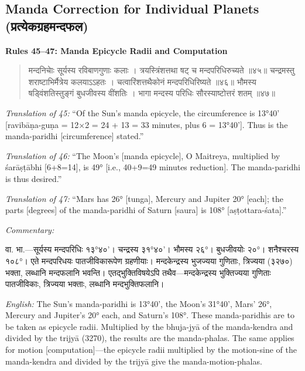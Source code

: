 \documentclass[11pt,a4paper]{book}
\newcommand{\dev}[1]{{\devanagarifont #1}}
\newenvironment{shloka}{%
  \begin{verse}
  \devanagarifont\color{versecolor}%
}{\end{verse}}
\newenvironment{vasaanaskt}{%
  \par\vspace{0.5em}\noindent\small\textit{Commentary:}%
}{\par\vspace{0.5em}}
\newcommand{\ruleheading}[1]{%
  \par\vspace{0.8em}\noindent\textbf{\color{sectioncolor}#1}\par\vspace{0.3em}%
}
\begin{document}
\subsection{Manda Correction for Individual Planets (\dev{प्रत्येकग्रहमन्दफल})}

\ruleheading{Rules 45--47: Manda Epicycle Radii and Computation}

\begin{shloka}
\begin{altverse}
\dev{मन्दनिचेाः सूर्यस्य रविबाणगुणाः कलाः ।}
\dev{त्रयस्त्रिंशत्तथा षट् च मन्दपरिधिरुच्यते ॥४५॥}
\dev{चन्द्रमस्तु शराष्टाभिर्मैत्रेय कलयाऽऽहतः ।}
\dev{चत्वारिंशत्तथैकोनं मन्दपरिधिरिष्यते ॥४६॥}
\dev{भौमस्य षड्विंशतिस्तुङ्गं बुधजीवस्य वींशतिः ।}
\dev{भागा मन्दस्य परिधिः सौरस्याष्टोत्तरं शतम् ॥४७॥}
\end{altverse}
\end{shloka}

\textit{Translation of 45:} ``Of the Sun's manda epicycle, the circumference is 13°40' [ravibāṇa-guṇa = 12×2 = 24 + 13 = 33 minutes, plus 6 = 13°40']. Thus is the manda-paridhi [circumference] stated.''

\textit{Translation of 46:} ``The Moon's [manda epicycle], O Maitreya, multiplied by śarāṣṭābhi [6+8=14], is 49° [i.e., 40+9=49 minutes reduction]. The manda-paridhi is thus desired.''

\textit{Translation of 47:} ``Mars has 26° [tunga], Mercury and Jupiter 20° [each]; the parts [degrees] of the manda-paridhi of Saturn [saura] is 108° [aṣṭottara-śata].''

\begin{vasaanaskt}
\dev{वा. भा.}---सूर्यस्य मन्दपरिधिः १३°४०'। चन्द्रस्य ३१°४०'। भौमस्य २६°। बुधजीवयोः २०°। शनैश्चरस्य १०८°। एते मन्दपरिधयः पातजीविकारूपेण ग्रहणीयाः। मन्दकेन्द्रस्य भुजज्यया गुणिताः, त्रिज्यया (३२७०) भक्ता, लब्धानि मन्दफलानि भवन्ति। एतद्भुक्तिविषयेऽपि तथैव---मन्दकेन्द्रस्य भुक्तिज्यया गुणिताः पातजीविकाः, त्रिज्यया भक्ताः, लब्धानि मन्दभुक्तिफलानि।

\textit{English:} The Sun's manda-paridhi is 13°40', the Moon's 31°40', Mars' 26°, Mercury and Jupiter's 20° each, and Saturn's 108°. These manda-paridhis are to be taken as epicycle radii. Multiplied by the bhuja-jyā of the manda-kendra and divided by the trijyā (3270), the results are the manda-phalas. The same applies for motion [computation]---the epicycle radii multiplied by the motion-sine of the manda-kendra and divided by the trijyā give the manda-motion-phalas.
\end{vasaanaskt}
\end{document}
